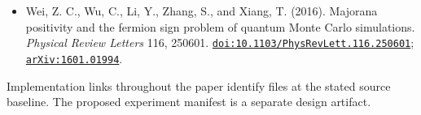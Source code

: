 \documentclass[
  11pt,
]{article}
\begin{document}
\begin{itemize}
  the sign problem in the fermionic quantum Monte Carlo algorithm.
  \emph{Physical Review B} 71, 155115.
  \href{https://doi.org/10.1103/PhysRevB.71.155115}{\nolinkurl{doi:10.1103/PhysRevB.71.155115}};
  \href{https://arxiv.org/abs/cond-mat/0407272v3}{\nolinkurl{arXiv:cond-mat/0407272v3}}.
\item
  Wei, Z. C., Wu, C., Li, Y., Zhang, S., and Xiang, T. (2016). Majorana
  positivity and the fermion sign problem of quantum Monte Carlo
  simulations. \emph{Physical Review Letters} 116, 250601.
  \href{https://doi.org/10.1103/PhysRevLett.116.250601}{\nolinkurl{doi:10.1103/PhysRevLett.116.250601}};
  \href{https://arxiv.org/abs/1601.01994}{\nolinkurl{arXiv:1601.01994}}.
\end{itemize}

Implementation links throughout the paper identify files at the stated
source baseline. The proposed experiment manifest is a separate design
artifact.
\end{document}
